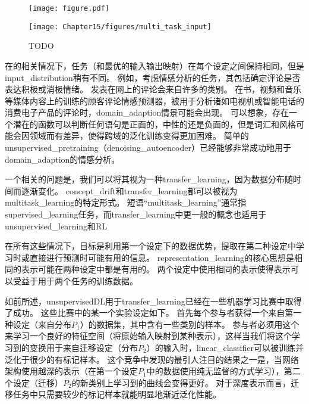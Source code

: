 \begin{figure}[!htb]
\ifOpenSource
\centerline{\texttt{[image: figure.pdf]}}
\else
\centerline{\texttt{[image: Chapter15/figures/multi\_task\_input]}}
\fi
\caption{TODO}
\label{fig:chap15_multi_task_input}
\end{figure}

在的相关情况下，任务（和最优的输入输出映射）在每个设定之间保持相同，但是\gls{input_distribution}稍有不同。 
例如，考虑情感分析的任务，其包括确定评论是否表达积极或消极情绪。 
发表在网上的评论会来自许多的类别。
在书，视频和音乐等媒体内容上的训练的顾客评论情感预测器，被用于分析诸如电视机或智能电话的消费电子产品的评论时，\gls{domain_adaption}情景可能会出现。
可以想象，存在一个潜在的函数可以判断任何语句是正面的，中性的还是负面的，但是词汇和风格可能会因领域而有差异，使得跨域的泛化训练变得更加困难。
简单的\gls{unsupervised_pretraining}（\gls{denoising_autoencoder}）已经能够非常成功地用于\gls{domain_adaption}的情感分析\citep{Glorot+al-ICML-2011}。


一个相关的问题是，我们可以将其视为一种\gls{transfer_learning}，因为数据分布随时间而逐渐变化。
\gls{concept_drift}和\gls{transfer_learning}都可以被视为\gls{multitask_learning}的特定形式。
短语“\gls{multitask_learning}”通常指\gls{supervised_learning}任务，而\gls{transfer_learning}中更一般的概念也适用于\gls{unsupervised_learning}和\gls{RL}

在所有这些情况下，目标是利用第一个设定下的数据优势，提取在第二种设定中学习时或直接进行预测时可能有用的信息。
\gls{representation_learning}的核心思想是相同的表示可能在两种设定中都是有用的。
两个设定中使用相同的表示使得表示可以受益于用于两个任务的训练数据。


如前所述，\gls{unsupervised}\gls{DL}用于\gls{transfer_learning}已经在一些机器学习比赛中取得了成功\citep{UTLC+LISA-2011-small,goodfellow+all-NIPS2011}。
这些比赛中的某一个实验设定如下。
首先每个参与者获得一个来自第一种设定（来自分布$P_1$）的数据集，其中含有一些类别的样本。
参与者必须用这个来学习一个良好的特征空间（将原始输入映射到某种表示），这样当我们将这个学习到的变换用于来自迁移设定（分布$P_2$）的输入时，\gls{linear_classifier}可以被训练并泛化于很少的有标记样本。
这个竞争中发现的最引人注目的结果之一是，当网络架构使用越深的表示（在第一个设定$P_1$中的数据使用纯无监督的方式学习），第二个设定（迁移）$P_2$的新类别上学习到的曲线会变得更好。
对于深度表示而言，迁移任务中只需要较少的标记样本就能明显地渐近泛化性能。


